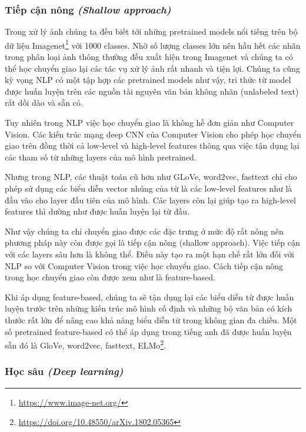 \subsubsection{Tiếp cận nông \textit{(Shallow approach)}}
Trong xử lý ảnh chúng ta đều biết tới những pretrained models nổi tiếng trên bộ dữ liệu Imagenet\footnote{\url{https://www.image-net.org/}} với 1000 classes. Nhờ số lượng classes lớn nên hầu hết các nhãn trong phân loại ảnh thông thường đều xuất hiện trong Imagenet và chúng ta có thể học chuyển giao lại các tác vụ xử lý ảnh rất nhanh và tiện lợi. Chúng ta cũng kỳ vọng NLP có một tập hợp các pretrained models như vậy, tri thức từ model được huấn luyện trên các nguồn tài nguyên văn bản không nhãn (unlabeled text) rất dồi dào và sẵn có\cite{webpage20}.

Tuy nhiên trong NLP việc học chuyển giao là không hề đơn giản như Computer Vision. Các kiến trúc mạng deep CNN của Computer Vision cho phép học chuyển giao trên đồng thời cả low-level và high-level features thông qua việc tận dụng lại các tham số từ những layers của mô hình pretrained.

Nhưng trong NLP, các thuật toán cũ hơn như GLoVe, word2vec, fasttext chỉ cho phép sử dụng các biểu diễn vector nhúng của từ là các low-level features như là đầu vào cho layer đầu tiên của mô hình. Các layers còn lại giúp tạo ra high-level features thì dường như được huấn luyện lại từ đầu.

Như vậy chúng ta chỉ chuyển giao được các đặc trưng ở mức độ rất nông nên phương pháp này còn được gọi là tiếp cận nông (shallow approach). Việc tiếp cận với các layers sâu hơn là không thể. Điều này tạo ra một hạn chế rất lớn đối với NLP so với Computer Vision trong việc học chuyển giao. Cách tiếp cận nông trong học chuyển giao còn được xem như là feature-based.

Khi áp dụng feature-based, chúng ta sẽ tận dụng lại các biểu diễn từ được huấn luyện trước trên những kiến trúc mô hình cố định và những bộ văn bản có kích thước rất lớn để nâng cao khả năng biểu diễn từ trong không gian đa chiều. Một số pretrained feature-based có thể áp dụng trong tiếng anh đã được huấn luyện sẵn đó là GloVe, word2vec, fasttext, ELMo\footnote{\url{https://doi.org/10.48550/arXiv.1802.05365}}.

\subsubsection{Học sâu \textit{(Deep learning)}}

